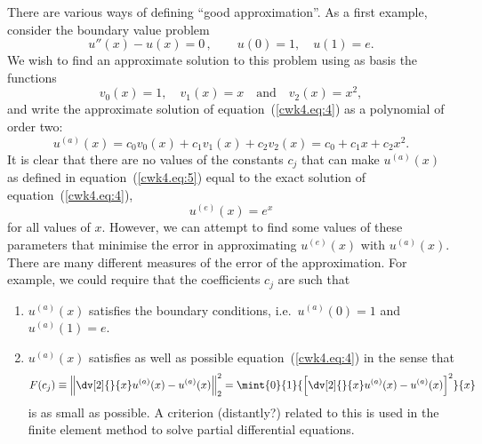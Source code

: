 There are various ways of defining ``good approximation''.  As a first
example, consider the boundary value problem
%
\begin{equation}
  u''(x) - u(x) = 0 \, , \qquad
  u(0) = 1, \quad u(1) = e.
  \label{cwk4.eq:4}
\end{equation}
%
We wish to find an approximate solution to this problem using as basis
the functions
%
\begin{equation*}
  v_0(x) = 1 , \quad v_1(x) = x \quad \text{and} \quad v_2(x) = x^2,
\end{equation*}
%
and write the approximate solution of equation~(\ref{cwk4.eq:4}) as a
polynomial of order two:
%
\begin{equation}
  u^{(a)}(x) = c_0 v_0(x) + c_1 v_1(x) + c_2 v_2(x) =
  c_0 + c_1 x + c_2 x^2 .
 \label{cwk4.eq:5}
\end{equation}
%
It is clear that there are no values of the constants $c_j$ that can
make $u^{(a)}(x)$ as defined in equation~(\ref{cwk4.eq:5}) equal to
the exact solution of equation~(\ref{cwk4.eq:4}),
%
\begin{equation}
  u^{(e)}(x) = e^x
  \label{cwk4.eq:3}
\end{equation}
%
for all values of $x$.  However, we can attempt to find some values of
these parameters that minimise the error in approximating $u^{(e)}(x)$
with $u^{(a)}(x)$.  There are many different measures of the error of
the approximation.  For example, we could require that the
coefficients $c_j$ are such that

\begin{enumerate}
\item $u^{(a)}(x)$ satisfies the boundary conditions, i.e.\ $u^{(a)}(0)=1$ and $u^{(a)}(1) = e$.
\item $u^{(a)}(x)$ satisfies as well as possible
  equation~(\ref{cwk4.eq:4}) in the sense that
  \begin{equation}
    F(c_j) \equiv
    \left \| \dv[2]{}{x} u^{(a)}(x) - u^{(a)}(x) \right \|_2^2 =
    \mint{0}{1}{\left [ \dv[2]{}{x} u^{(a)}(x) - u^{(a)}(x)
    \right ]^2}{x}
    \label{eq:10}
  \end{equation}
  is as small as possible.  A criterion (distantly?) related to this
  is used in the finite element method to solve partial differential
  equations.
\end{enumerate}

